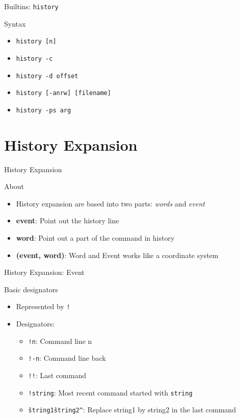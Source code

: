 \documentclass[10pt, compress, aspectratio=169]{beamer}
\begin{document}
\begin{frame}{Builtins: \texttt{history}}
  \begin{alertblock}{Syntax}
    \begin{itemize}
      \item \texttt{history [n]}
      \item \texttt{history -c}
      \item \texttt{history -d offset}
      \item \texttt{history [-anrw] [filename]}
			\item \texttt{history -ps arg}
    \end{itemize}
  \end{alertblock}
\end{frame}

\section{History Expansion}

\begin{frame}{History Expansion}
  \begin{exampleblock}{About}
    \begin{itemize}
      \item History expansion are based into two parts: \textit{words} and
						\textit{event}
			\item \textbf{event}: Point out the history line 
			\item \textbf{word}: Point out a part of the command in history
			\item \textbf{(event, word)}: Word and Event works like a coordinate
						system
    \end{itemize}
  \end{exampleblock}
\end{frame}

\begin{frame}{History Expansion: Event}
  \begin{exampleblock}{Basic designators}
    \begin{itemize}
			\item Represented by \texttt{!}
			\item Designators:
			\begin{itemize}
				\item \texttt{!n}: Command line n
				\item \texttt{!-n}: Command line back
				\item \texttt{!!}: Last command
				\item \texttt{!string}: Most recent command started with \texttt{string}
				\item \texttt{\^string1\^string2\^}: Replace string1 by string2 in the
							last command
			\end{itemize}
    \end{itemize}
  \end{exampleblock}
\end{frame}
\end{document}
